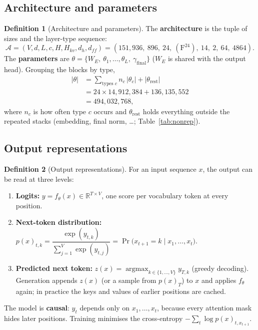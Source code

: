 \documentclass[10pt,a4paper]{article}
\theoremstyle{definition}
\newtheorem{definition}{Definition}[section]
\begin{document}
\subsection{Architecture and parameters}
\begin{definition}[Architecture and parameters]
The \textbf{architecture} is the tuple of sizes and the layer-type sequence:
\begin{equation}
  \mathcal{A} = (V,d,L,c,H,H_{kv},d_h,d_{ff}) = (151{,}936,\ 896,\ 24,\ (\mathrm{F}^{24}),\ 14,\ 2,\ 64,\ 4864).
\end{equation}
The \textbf{parameters} are $\theta=\{W_E,\ \theta_1,\dots,\theta_L,\ \gamma_{\mathrm{final}}\}$ ($W_E$ is shared with the output head). Grouping the blocks by type,
\begin{align*}
  |\theta| &= \sum_{\text{types } c} n_c\,|\theta_c| + |\theta_{\mathrm{rest}}| \\
  &= 24\times14{,}912{,}384 + 136{,}135{,}552 \\
  &= 494{,}032{,}768,
\end{align*}
where $n_c$ is how often type $c$ occurs and $\theta_{\mathrm{rest}}$ holds everything outside the repeated stacks (embedding, final norm, \dots; Table~\ref{tab:nonrep}).
\end{definition}
\subsection{Output representations}
\begin{definition}[Output representations]
For an input sequence $x$, the output can be read at three levels:
\begin{enumerate}
\item \textbf{Logits:} $y=f_\theta(x)\in\mathbb{R}^{T\times V}$, one score per vocabulary token at every position.
\item \textbf{Next-token distribution:} $p(x)_{t,k}=\dfrac{\exp(y_{t,k})}{\sum_{j=1}^{V}\exp(y_{t,j})}=\Pr\big(x_{t+1}=k\mid x_{1},\dots,x_{t}\big)$.
\item \textbf{Predicted next token:} $z(x)=\operatorname{argmax}_{k\in\{1,\dots,V\}} y_{T,k}$ (greedy decoding). Generation appends $z(x)$ (or a sample from $p(x)_{T}$) to $x$ and applies $f_\theta$ again; in practice the keys and values of earlier positions are cached.
\end{enumerate}
The model is \textbf{causal}: $y_t$ depends only on $x_1,\dots,x_t$, because every attention mask hides later positions. Training minimises the cross-entropy $-\sum_{t}\log p(x)_{t,x_{t+1}}$.
\end{definition}
\end{document}
